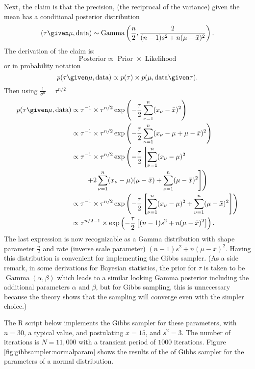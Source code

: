 \documentclass[12pt]{article}
\begin{document}
Next, the claim is that the precision, (the reciprocal of the variance)
given the mean has a conditional posterior distribution
\[
    (\tau \given \mu, \text{data}) \sim
    \operatorname{Gamma}
    \left( \frac{n}{2}, \frac{2}{(n-1) s^2 + n (\mu - \bar{x})^2} \right).
\] The derivation of the claim is:
\[
    \text{ Posterior} \propto \text{ Prior } \times \text{ Likelihood }
\] or in probability notation
\[
    p(\tau \given \mu, \text{data} ) \propto p(\tau) \times p( \mu,
    \text{data} \given \tau).
\] Then using \( \frac{1}{\sigma^n} = \tau^{n/2} \)
\begin{align*}
    p(\tau \given \mu, \text{data} ) &\propto \tau^{-1} \times \tau^{n/2}
    \exp \left( -\frac{\tau}{2} \sum\limits_{\nu=1}^n (x_\nu - \bar{x})^2
    \right) \\
    & \propto \tau^{-1} \times \tau^{n/2} \exp \left( -\frac{\tau}{2}
    \sum\limits_{\nu=1}^n (x_\nu - \mu + \mu - \bar{x})^2 \right) \\
    & \propto \tau^{-1} \times \tau^{n/2} \exp \left( -\frac{\tau}{2}
    \left[ \sum\limits_{\nu=1}^n (x_\nu - \mu)^2 \right.  \right.  \\
    & \qquad \left.  \left.  +2 \sum\limits_{\nu=1}^n (x_\nu - \mu)(\mu
    - \bar{x}) + \sum\limits_{\nu=1}^n (\mu - \bar{x})^2 \right] \right)
    \\
    & \propto \tau^{-1} \times \tau^{n/2} \exp \left( -\frac{\tau}{2}
    \left[ \sum\limits_{\nu=1}^n (x_\nu - \mu)^2 + \sum\limits_{\nu=1}^n
    (\mu - \bar{x})^2 \right] \right) \\
    & \propto \tau^{n/2-1} \times \exp \left( -\frac{\tau}{2} \left[(n-1)
    s^2 + n(\mu - \bar{x})^2 \right] \right).
\end{align*}
The last expression is now recognizable as a Gamma distribution%
with shape parameter \( \frac{n}{2} \) and rate (inverse scale parameter)
\( (n-1) s^2 + n(\mu - \bar{x})^2 \).  Having this distribution is
convenient for implementing the Gibbs sampler.  (As a side remark, in
some derivations for Bayesian statistics, the prior for \( \tau \) is
taken to be \(
\operatorname{Gamma}
(\alpha, \beta) \) which leads to a similar looking Gamma posterior
including the additional parameters \( \alpha \) and \( \beta \), but
for Gibbs sampling, this is unnecessary because the theory shows that
the sampling will converge even with the simpler choice.)

The R script below implements the Gibbs sampler for these parameters,
with \( n = 30 \), a typical value, and postulating \( \bar{x} = 15 \),
and \( s^2 = 3 \).  The number of iterations is \( N = 11{,}000 \) with
a transient period of \( 1000 \) iterations.  Figure~%
\ref{fig:gibbsampler:normalparam} shows the results of the of Gibbs
sampler for the parameters of a normal distribution.
\end{document}
